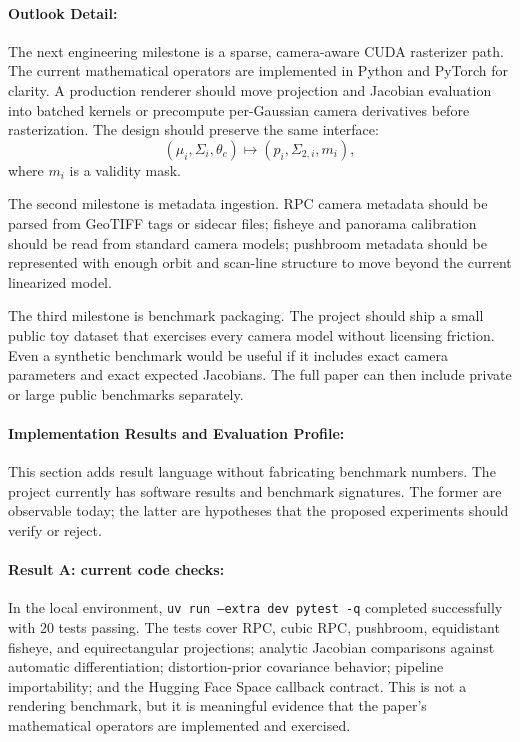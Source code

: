 \documentclass{article}
\begin{document}
\paragraph{Outlook Detail:}

The next engineering milestone is a sparse, camera-aware CUDA rasterizer path. The current mathematical operators are implemented in Python and PyTorch for clarity. A production renderer should move projection and Jacobian evaluation into batched kernels or precompute per-Gaussian camera derivatives before rasterization. The design should preserve the same interface:
\begin{equation}
  (\mu_i,\Sigma_i,\theta_c)\mapsto (p_i,\Sigma_{2,i},m_i),
\end{equation}
where $m_i$ is a validity mask.

The second milestone is metadata ingestion. RPC camera metadata should be parsed from GeoTIFF tags or sidecar files; fisheye and panorama calibration should be read from standard camera models; pushbroom metadata should be represented with enough orbit and scan-line structure to move beyond the current linearized model.

The third milestone is benchmark packaging. The project should ship a small public toy dataset that exercises every camera model without licensing friction. Even a synthetic benchmark would be useful if it includes exact camera parameters and exact expected Jacobians. The full paper can then include private or large public benchmarks separately.

\paragraph{Implementation Results and Evaluation Profile:}

This section adds result language without fabricating benchmark numbers. The project currently has software results and benchmark signatures. The former are observable today; the latter are hypotheses that the proposed experiments should verify or reject.

\paragraph{Result A: current code checks:}

In the local environment, \texttt{uv run --extra dev pytest -q} completed successfully with 20 tests passing. The tests cover RPC, cubic RPC, pushbroom, equidistant fisheye, and equirectangular projections; analytic Jacobian comparisons against automatic differentiation; distortion-prior covariance behavior; pipeline importability; and the Hugging Face Space callback contract. This is not a rendering benchmark, but it is meaningful evidence that the paper's mathematical operators are implemented and exercised.
\end{document}
